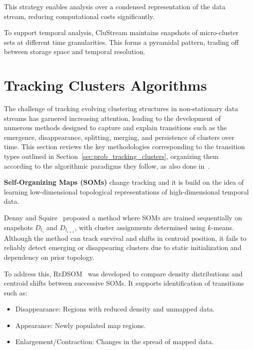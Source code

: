 This strategy enables analysis over a condensed representation of the data
stream, reducing computational costs significantly.

To support temporal analysis, CluStream maintains snapshots of micro-cluster
sets at different time granularities. This forms a pyramidal pattern, trading
off between storage space and temporal resolution.

\section{Tracking Clusters Algorithms}\label{sec:tracking_clusters_algorithms}

The challenge of tracking evolving clustering structures in non-stationary data
streams has garnered increasing attention, leading to the development of
numerous methods designed to capture and explain transitions such as the
emergence, disappearance, splitting, merging, and persistence of clusters over
time. This section reviews the key methodologies corresponding to the
transition types outlined in Section~\ref{sec:prob_tracking_clusters},
organizing them according to the algorithmic paradigms they follow, as also
done in~\cite{tracking_review}.

\textbf{Self-Organizing Maps (SOMs)} change tracking and it is build on the idea of
learning low-dimensional topological representations of high-dimensional temporal data.

Denny and Squire~\cite{som_tracking} proposed a method where \textsc{SOMs} are
trained sequentially on snapshots $D_{t_i}$ and $D_{t_{i+1}}$, with cluster
assignments determined using $k$-means. Although the method can track survival
and shifts in centroid position, it fails to reliably detect emerging or
disappearing clusters due to static initialization and dependency on prior
topology.

To address this, \textsc{ReDSOM}~\cite{redsom_tracking} was developed to
compare density distributions and centroid shifts between successive SOMs. It
supports identification of transitions such as:

\begin{itemize}
    \item Disappearance: Regions with reduced density and unmapped data.

    \item Appearance: Newly populated map regions.

    \item Enlargement/Contraction: Changes in the spread of mapped data.
\end{itemize}

